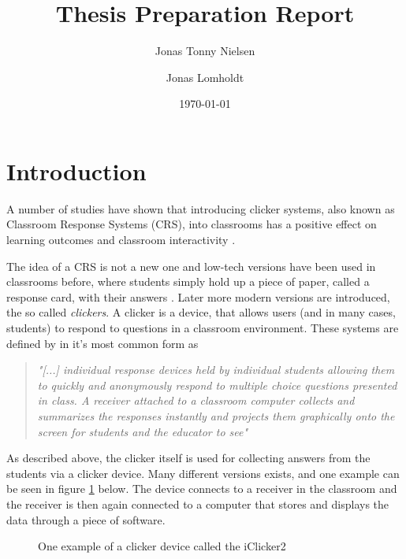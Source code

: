 \documentclass{article}
\title{Thesis Preparation Report}
\author{Jonas Tonny Nielsen \and Jonas Lomholdt}
\date{\today}
\begin{document}
\maketitle

\listoftodos

\tableofcontents
\listoffigures


\section{Introduction} %
A number of studies have shown that introducing clicker systems, also known as Classroom Response Systems (CRS), into classrooms has a positive effect on learning outcomes and classroom interactivity \cite{yourstone2008classroom, siau2006use, lantz2014effectiveness}. 

The idea of a CRS is not a new one and low-tech versions have been used in classrooms before, where students simply hold up a piece of paper, called a response card, with their answers \cite{ralph1994effects}. 
Later more modern versions are introduced, the so called \emph{clickers}. A clicker is a device, that allows users (and in many cases, students) to respond to questions in a classroom environment. These systems are defined by  in it's most common form as 

\begin{quote}
    \emph{"[...] individual response devices held by individual students allowing them to quickly and anonymously respond to multiple choice questions presented in class. A receiver attached to a classroom computer collects and summarizes the responses instantly and projects them graphically onto the screen for students and the educator to see"} \cite{lantz2014effectiveness}
\end{quote}

As described above, the clicker itself is used for collecting answers from the students via a clicker device. Many different versions exists, and one example can be seen in figure \ref{fig:iclicker} below. The device connects to a receiver in the classroom and the receiver is then again connected to a computer that stores and displays the data through a piece of software.

\begin{figure}[H]
\capstart
	\centering
	\caption[iClicker2]{One example of a clicker device called the iClicker2 \label{fig:iclicker}}
\end{figure}
\end{document}
